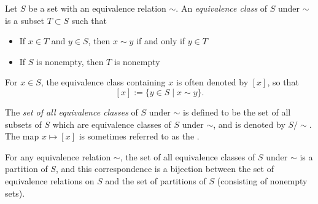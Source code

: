 \documentclass[12pt]{article}
\begin{document}
Let $S$ be a set with an equivalence relation $\sim$. An {\em equivalence class} of $S$ under $\sim$ is a subset $T\subset S$ such that
\begin{itemize}
\item If $x \in T$ and $y \in S$, then $x \sim y$ if and only if $y \in T$
\item If $S$ is nonempty, then $T$ is nonempty
\end{itemize}

For $x \in S$, the equivalence class containing $x$ is often denoted by $[x]$, so that
$$
[x] := \{ y \in S \mid x \sim y \}.
$$

The {\em set of all equivalence classes} of $S$ under $\sim$ is defined to be the set of all subsets of $S$ which are equivalence classes of $S$ under $\sim$, and is denoted by $S/\sim$.  The map $x\mapsto [x]$ is sometimes referred to as the .

For any equivalence relation $\sim$, the set of all equivalence classes of $S$ under $\sim$ is a partition of $S$, and this correspondence is a bijection between the set of equivalence relations on $S$ and the set of partitions of $S$ (consisting of nonempty sets).
\end{document}
